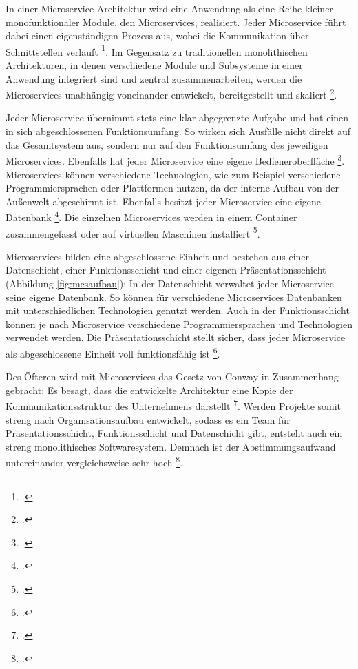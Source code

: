 In einer Microservice-Architektur wird eine Anwendung als eine Reihe kleiner monofunktionaler Module, den Microservices, realisiert. Jeder Microservice führt dabei einen eigenständigen Prozess aus, wobei die Kommunikation über Schnittstellen verläuft \footcite[Vgl.][S.1]{filho2021}. Im Gegensatz zu traditionellen monolithischen Architekturen, in denen verschiedene Module und Subsysteme in einer Anwendung integriert sind und zentral zusammenarbeiten, werden die Microservices unabhängig voneinander entwickelt, bereitgestellt und skaliert \footcite[Vgl.][S.1]{laigner2021}.

Jeder Microservice übernimmt stets eine klar abgegrenzte Aufgabe und hat einen in sich abgeschlossenen Funktionsumfang. So wirken sich Ausfälle nicht direkt auf das Gesamtsystem aus, sondern nur auf den Funktionsumfang des jeweiligen Microservices. Ebenfalls hat jeder Microservice eine eigene Bedieneroberfläche \footcite[Vgl.][S.79]{albrecht2020}. Microservices können verschiedene Technologien, wie zum Beispiel verschiedene Programmiersprachen oder Plattformen nutzen, da der interne Aufbau von der Außenwelt abgeschirmt ist. Ebenfalls besitzt jeder Microservice eine eigene Datenbank \footcite[Vgl.][S.2]{wolff2018}. Die einzelnen Microservices werden in einem Container zusammengefasst oder auf virtuellen Maschinen installiert \footcite[Vgl.][S.79]{albrecht2020}.

Microservices bilden eine abgeschlossene Einheit und bestehen aus einer Datenschicht, einer Funktionsschicht und einer eigenen Präsentationsschicht (Abbildung \ref{fig:mcsaufbau}): In der Datenschicht verwaltet jeder Microservice seine eigene Datenbank. So können für verschiedene Microservices Datenbanken mit unterschiedlichen Technologien genutzt werden. Auch in der Funktionsschicht können je nach Microservice verschiedene Programmiersprachen und Technologien verwendet werden. Die Präsentationsschicht stellt sicher, dass jeder Microservice als abgeschlossene Einheit voll funktionsfähig ist \footcite[Vgl.][S.81 f.]{albrecht2020}.


Des Öfteren wird mit Microservices das Gesetz von Conway in Zusammenhang gebracht: Es besagt, dass die entwickelte Architektur eine Kopie der Kommunikationsstruktur des Unternehmens darstellt \footcite[Vgl.][S.2]{fowler2015}. Werden Projekte somit streng nach Organisationsaufbau entwickelt, sodass es ein Team für Präsentationsschicht, Funktionsschicht und Datenschicht gibt, entsteht auch ein streng monolithisches Softwaresystem. Demnach ist der Abstimmungsaufwand untereinander vergleichsweise sehr hoch \footcite[Vgl.][S.81]{albrecht2020}. 

